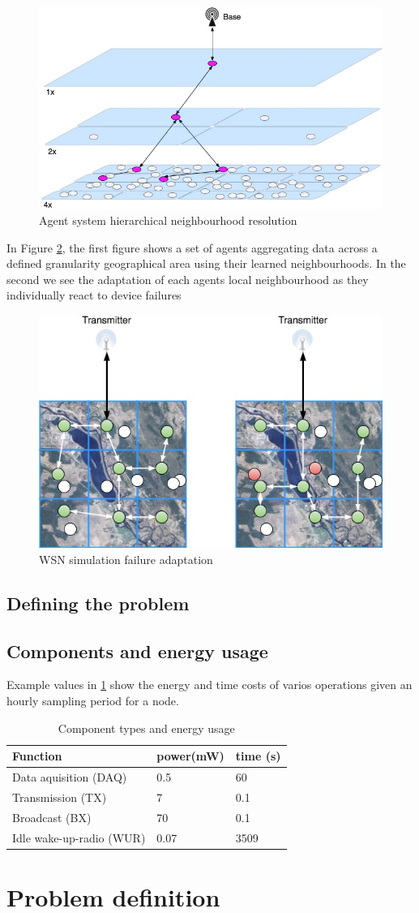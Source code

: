 \begin{figure}[ht]
	\centering
	\includegraphics[width=0.5\linewidth]{WSN_hierarchical_resolution}
	\caption{Agent system hierarchical neighbourhood resolution}
	\label{fig:wsnhierarchicalresolution}
\end{figure}
In Figure \ref{fig:wsnsimulationmapfailureadaptation}, the first figure shows a set of agents aggregating data across a defined granularity geographical area using their learned neighbourhoods. In the second we see the adaptation of each agents local neighbourhood as they individually react to device failures
\begin{figure}[ht]
	\centering
	\includegraphics[width=0.5\linewidth]{WSN_simulation_map_failure_adaptation}
	\caption{WSN simulation failure adaptation}
	\label{fig:wsnsimulationmapfailureadaptation}
\end{figure}

\subsection{Defining the problem}
\subsection{Components and energy usage}

Example values in \ref{table:components_energy_usage} show the energy and time costs of varios operations given an hourly sampling period for a node.


\begin{table}
\begin{tabular}{p{}p{} p{} }
\hline
Function & power(mW) & time (s) \\
\hline
Data aquisition (DAQ) & 0.5 & 60 \\
Transmission (TX) & 7 & 0.1 \\
Broadcast (BX) & 70 & 0.1 \\
Idle wake-up-radio (WUR) & 0.07 & 3509 \\
\end{tabular}
\caption{Component types and energy usage}
\label{table:components_energy_usage}
\end{table}

\section{Problem definition}

